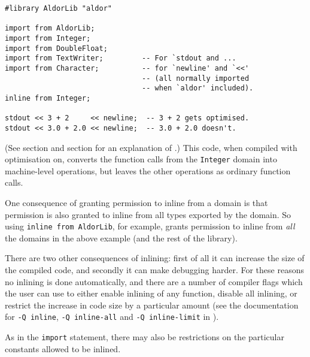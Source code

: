 \begin{small}
\begin{verbatim}
#library AldorLib "aldor"

import from AldorLib;
import from Integer;
import from DoubleFloat;
import from TextWriter;         -- For `stdout and ...
import from Character;          -- for `newline' and `<<'
                                -- (all normally imported
                                -- when `aldor' included).
inline from Integer;

stdout << 3 + 2     << newline;  -- 3 + 2 gets optimised.
stdout << 3.0 + 2.0 << newline;  -- 3.0 + 2.0 doesn't.
\end{verbatim}
\end{small}

(See section  and section
 for an explanation of .)
This code, when compiled with optimisation on, converts the function
calls from the {\tt Integer} domain into machine-level operations,
but leaves the other operations as ordinary function calls.

One consequence of granting permission to inline from a domain is that
permission is also granted to inline from all types exported by
the domain.  So using \verb"inline from AldorLib", for example, grants
permission to inline from {\em all} the domains in the
above example (and the rest of the \asharp{} library).

There are two other consequences of inlining: first of all it can increase
the size of the compiled code, and secondly it can make debugging harder.
For these reasons no inlining is done automatically, and there are a number
of compiler flags which the user can use to either enable inlining of any
function, disable all inlining, or restrict the increase in code size by
a particular amount (see the documentation for {\tt -Q inline}, 
{\tt -Q inline-all} and {\tt -Q inline-limit} in 
).

As in the {\tt import} statement, there may also be restrictions on
the particular constants allowed to be inlined.


